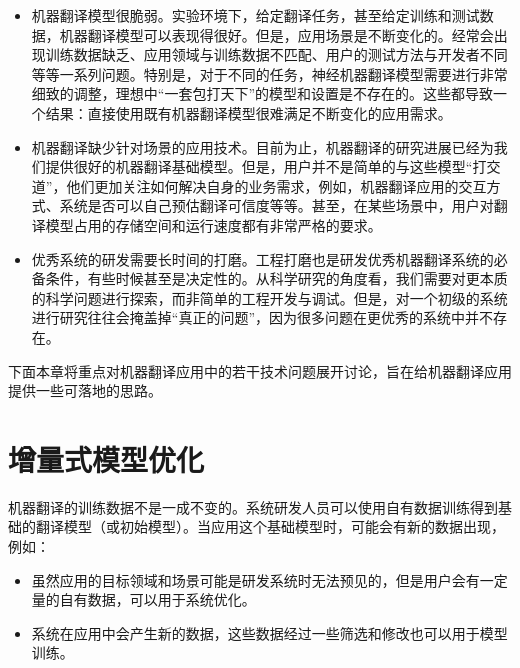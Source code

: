 \begin{itemize}
\vspace{0.5em}
\item 机器翻译模型很脆弱。实验环境下，给定翻译任务，甚至给定训练和测试数据，机器翻译模型可以表现得很好。但是，应用场景是不断变化的。经常会出现训练数据缺乏、应用领域与训练数据不匹配、用户的测试方法与开发者不同等等一系列问题。特别是，对于不同的任务，神经机器翻译模型需要进行非常细致的调整，理想中“一套包打天下”的模型和设置是不存在的。这些都导致一个结果：直接使用既有机器翻译模型很难满足不断变化的应用需求。

\vspace{0.5em}
\item 机器翻译缺少针对场景的应用技术。目前为止，机器翻译的研究进展已经为我们提供很好的机器翻译基础模型。但是，用户并不是简单的与这些模型“打交道”，他们更加关注如何解决自身的业务需求，例如，机器翻译应用的交互方式、系统是否可以自己预估翻译可信度等等。甚至，在某些场景中，用户对翻译模型占用的存储空间和运行速度都有非常严格的要求。

\vspace{0.5em}
\item 优秀系统的研发需要长时间的打磨。工程打磨也是研发优秀机器翻译系统的必备条件，有些时候甚至是决定性的。从科学研究的角度看，我们需要对更本质的科学问题进行探索，而非简单的工程开发与调试。但是，对一个初级的系统进行研究往往会掩盖掉“真正的问题”，因为很多问题在更优秀的系统中并不存在。
\vspace{0.5em}
\end{itemize}

\parinterval 下面本章将重点对机器翻译应用中的若干技术问题展开讨论，旨在给机器翻译应用提供一些可落地的思路。

\sectionnewpage
\section{增量式模型优化}

\parinterval 机器翻译的训练数据不是一成不变的。系统研发人员可以使用自有数据训练得到基础的翻译模型（或初始模型）。当应用这个基础模型时，可能会有新的数据出现，例如：

\begin{itemize}
\vspace{0.5em}
\item 虽然应用的目标领域和场景可能是研发系统时无法预见的，但是用户会有一定量的自有数据，可以用于系统优化。
\vspace{0.5em}
\item 系统在应用中会产生新的数据，这些数据经过一些筛选和修改也可以用于模型训练。
\vspace{0.5em}
\end{itemize}


